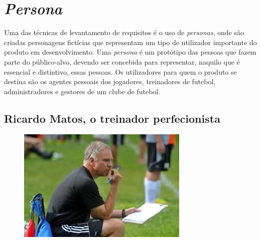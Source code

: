 \chapter{\emph{Persona}}

Uma das técnicas de levantamento de requisitos é o uso de \emph{personas}, onde são criadas personagens fictícias que representam um tipo de utilizador importante do produto em desenvolvimento. Uma \emph{persona} é um protótipo das pessoas que fazem parte do público-alvo, devendo ser concebida para representar, naquilo que é essencial e distintivo, essas pessoas.
Os utilizadores para quem o produto se destina são os agentes pessoais dos jogadores, treinadores de futebol, administradores e gestores de um clube de futebol.


\section{Ricardo Matos, o treinador perfecionista}

\begin{figure}[H]
    \includegraphics[scale=1]{img/treinador.png}
\end{figure}

